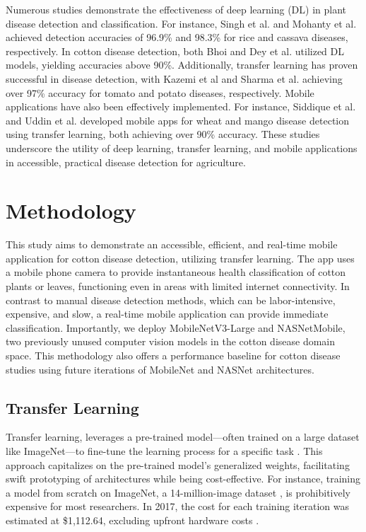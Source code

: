 \documentclass[conference]{IEEEtran}
\begin{document}
Numerous studies demonstrate the effectiveness of deep learning (DL) in plant disease detection and classification. For instance, Singh et al. \cite{Singh-etal} and Mohanty et al. \cite{Mohanty-etal} achieved detection accuracies of 96.9\% and 98.3\% for rice and cassava diseases, respectively. In cotton disease detection, both Bhoi \cite{Bhoi} and Dey et al.\cite{Dey-etal} utilized DL models, yielding accuracies above 90\%. Additionally, transfer learning has proven successful in disease detection, with Kazemi et al\cite{Kazemi-etal} and Sharma et al.\cite{Sharma-etal} achieving over 97\% accuracy for tomato and potato diseases, respectively. Mobile applications have also been effectively implemented. For instance, Siddique et al.\cite{Siddique-etal} and Uddin et al.\cite{Uddin-etal} developed mobile apps for wheat and mango disease detection using transfer learning, both achieving over 90\% accuracy. These studies underscore the utility of deep learning, transfer learning, and mobile applications in accessible, practical disease detection for agriculture.

\section{Methodology}

This study aims to demonstrate an accessible, efficient, and real-time mobile application for cotton disease detection, utilizing transfer learning. The app uses a mobile phone camera to provide instantaneous health classification of cotton plants or leaves, functioning even in areas with limited internet connectivity. In contrast to manual disease detection methods, which can be labor-intensive, expensive, and slow, a real-time mobile application can  provide immediate classification. Importantly, we deploy MobileNetV3-Large and NASNetMobile, two previously unused computer vision models in the cotton disease domain space. This methodology also offers a performance baseline for cotton disease studies using future iterations of MobileNet and NASNet architectures. 


\subsection{Transfer Learning}

Transfer learning, leverages a pre-trained model—often trained on a large dataset like ImageNet—to fine-tune the learning process for a specific task \cite{Shu}. This approach capitalizes on the pre-trained model's generalized weights, facilitating swift prototyping of architectures while being cost-effective. For instance, training a model from scratch on ImageNet, a 14-million-image dataset \cite{Reynolds}, is prohibitively expensive for most researchers. In 2017, the cost for each training iteration was estimated at \$1,112.64, excluding upfront hardware costs \cite{genuineimpact}.
\end{document}
